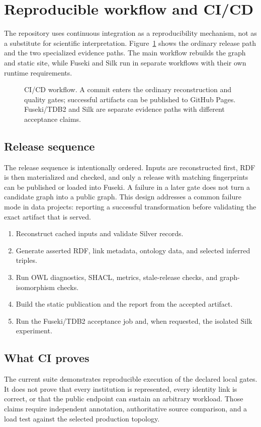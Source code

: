 \section{Reproducible workflow and CI/CD}
\label{sec:cicd}
The repository uses continuous integration as a reproducibility mechanism, not as a substitute
for scientific interpretation. Figure~\ref{fig:cicd-workflow} shows the ordinary release path
and the two specialized evidence paths. The main workflow rebuilds the graph and static site,
while Fuseki and Silk run in separate workflows with their own runtime requirements.

\begin{figure}[htbp]\centering
\resizebox{\textwidth}{!}{}
\caption[CI/CD and evidence workflow]{CI/CD workflow. A commit enters the ordinary reconstruction
and quality gates; successful artifacts can be published to GitHub Pages. Fuseki/TDB2 and Silk
are separate evidence paths with different acceptance claims.}
\label{fig:cicd-workflow}
\end{figure}

\subsection{Release sequence}
The release sequence is intentionally ordered. Inputs are reconstructed first, RDF is then
materialized and checked, and only a release with matching fingerprints can be published or
loaded into Fuseki. A failure in a later gate does not turn a candidate graph into a public
graph. This design addresses a common failure mode in data projects: reporting a successful
transformation before validating the exact artifact that is served.

\begin{enumerate}
\item Reconstruct cached inputs and validate Silver records.
\item Generate asserted RDF, link metadata, ontology data, and selected inferred triples.
\item Run OWL diagnostics, SHACL, metrics, stale-release checks, and graph-isomorphism checks.
\item Build the static publication and the report from the accepted artifact.
\item Run the Fuseki/TDB2 acceptance job and, when requested, the isolated Silk experiment.
\end{enumerate}

\subsection{What CI proves}
The current suite demonstrates reproducible execution of the declared local gates. It does
not prove that every institution is represented, every identity link is correct, or that the
public endpoint can sustain an arbitrary workload. Those claims require independent annotation,
authoritative source comparison, and a load test against the selected production topology.
